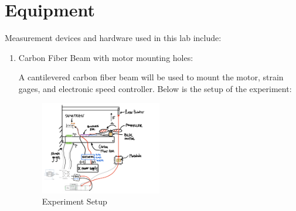 \documentclass{article}
\begin{document}
\section{Equipment}

Measurement devices and hardware used in this lab include:
\begin{enumerate}
  \item Carbon Fiber Beam with motor mounting holes:
  \vspace{1mm}

  A cantilevered carbon fiber beam will be used to mount the motor, strain gages, and electronic speed controller. Below is the setup of the experiment:

  \begin{figure}[H]
    \centering
    \includegraphics[width = 0.5\textwidth]{finalprojectimages/finalprojectsetup.png}
    \caption{Experiment Setup}
    \label{fig:finalsetup}
  \end{figure}


  \vspace{2.5mm}


\end{enumerate}
\end{document}
